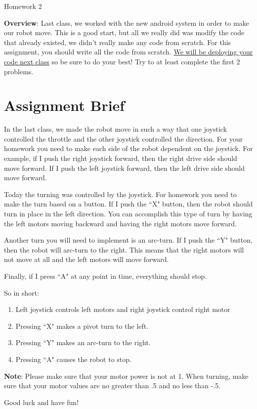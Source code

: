\documentclass[11pt,fleqn]{article}
\theoremstyle{definition}
\begin{document}
\begin{center}
{\Huge
Homework 2
}\\
\end{center}

\textbf{Overview}: Last class, we worked with the new android system in order to make our robot
move. This is a good start, but all we really did was modify the code that
already existed, we didn't really make any code from scratch. For this
assignment, you should write all the code from scratch. \underline{We will be
deploying your code next class} so be sure to do your best! Try to at least
complete the first 2 problems.

\section*{Assignment Brief}

In the last class, we made the robot move in such a way that one joystick
controlled the throttle  and the other joystick controlled
the direction. For your homework you need to make each side of the robot
dependent on the joystick. For example, if I push the right joystick forward,
then the right drive side should move forward. If I push the left joystick
forward, then the left drive side should move forward. 

Today the turning was controlled by the joystick. For homework you need to make
the turn based on a button. If I push the ``X" button, then the robot should
turn in place in the left direction. You can accomplish this type of turn by
having the left motors moving backward and having the right motors move forward. 

Another turn you will need to implement is an arc-turn. If I
push the ``Y" button, then the robot will arc-turn to the right. This means that
the right motors will not move at all and the left motors will move forward. 

Finally, if I press ``A" at any point in time, everything should stop. 

So in short:

\begin{enumerate}
\item
Left joystick controls left motors and right joystick control right motor

\item
Pressing ``X" makes a pivot turn to the left. 

\item
Pressing ``Y" makes an arc-turn to the right.

\item
Pressing ``A" causes the robot to stop. 
\end{enumerate}

\textbf{Note}: Please make sure that your motor power is not at 1. When turning,
make sure that your motor values are no greater than .5 and no less than -.5.

\begin{center}
Good luck and have fun!
\end{center} 
\end{document}
